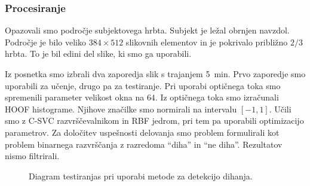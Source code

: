 \subsubsection{Procesiranje}\label{sec:data-preprocessing}
Opazovali smo področje subjektovega hrbta. Subjekt je ležal obrnjen navzdol. Področje je bilo veliko $384 \times 512$ slikovnih elementov in je pokrivalo približno $2/3$ hrbta. To je bil edini del slike, ki smo ga uporabili.

Iz posnetka smo izbrali dva zaporedja slik s trajanjem \SI{5}{min}. Prvo zaporedje smo uporabili za učenje, drugo pa za testiranje. Pri uporabi optičnega toka smo spremenili parameter velikost okna na $64$. Iz optičnega toka smo izračunali HOOF histograme. Njihove značilke smo normirali na intervalu $[-1,1]$. Učili smo z C-SVC razvrščevalnikom in RBF jedrom, pri tem pa uporabili optimizacijo parametrov. Za določitev uspešnosti delovanja smo problem formulirali kot problem binarnega razvrščanja z razredoma ``diha'' in ``ne diha''. Rezultatov nismo filtrirali.

\begin{figure}[htb]
	\centering
	\resizebox{\columnwidth}{!}{}
	\caption[Diagram testiranja pri uporabi metode za detekcijo dihanja]{Diagram testiranjas pri uporabi metode za detekcijo dihanja.}
	\label{fig:dihanje-postopek}
\end{figure}

